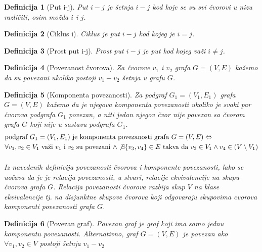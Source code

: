 \documentclass[11pt]{article}
\newtheorem{definition}{Definicija}
\begin{document}
		\begin{definition}[Put i-j]
		Put $i-j$ je šetnja $i-j$ kod koje se su svi čvorovi u nizu različiti, osim možda $i$ i $j$.
		\end{definition}
		
		\begin{definition}[Ciklus i]
		Ciklus je put $i-j$ kod kojeg je $i=j$.
		\end{definition}
		
		\begin{definition}[Prost put i-j]
		Prost put $i-j$ je put kod kojeg važi $i \neq j$.
		\end{definition}
	
		\begin{definition}[Povezanost čvorova]
		Za čvorove $v_1$ i $v_2$ grafa $G = (V, E)$ kažemo da su povezani ukoliko postoji $v_1-v_2$ šetnja u grafu $G$. 
		\end{definition}
	
		\begin{definition}[Komponenta povezanosti]
		Za podgraf $G_1 = (V_1, E_1)$ grafa $G = (V, E)$ kažemo da je njegova komponenta povezanosti ukoliko je svaki par čvorova podgrafa $G_1$ povezan, a niti jedan njegov čvor nije povezan sa čvorom grafa $G$ koji nije u sastavu podgrafa $G_1$. 
		\[
			\begin{split}
			&\text{podgraf } G_1 = (V_1, E_1) \text{ je komponenta povezanosti grafa } G = (V, E)  \Leftrightarrow \\
			& \forall v_1,v_2 \in V_1 \text{ važi } v_1 \text{ i } v_2 \text{ su povezani } \land \not \exists \{v_3, v_4\} \in E \text{ takva da } v_3 \in V_1 \land v_4 \in (V \setminus V_1)
			\end{split}
		\]
			\paragraph{}
			Iz navedenih definicija povezanosti čvorova i komponente povezanosti, lako se uočava da je je relacija povezanosti, u stvari, relacije ekvivalencije na skupu čvorova grafa $G$. Relacija povezanosti čvorova razbija skup $V$ na klase ekvivalencije tj. na disjunktne skupove čvorova koji odgovaraju skupovima cvorova komponenti povezanosti grafa $G$. 
		\end{definition}
	
		\begin{definition}[Povezan graf]
		Povezan graf je graf koji ima samo jednu komponentu povezanosti. 
		Alternativno, graf $G=(V,E)$ je povezan ako $\forall v_1,v_2 \in V$ postoji šetnja $v_1-v_2$
		\end{definition}
	
\end{document}
